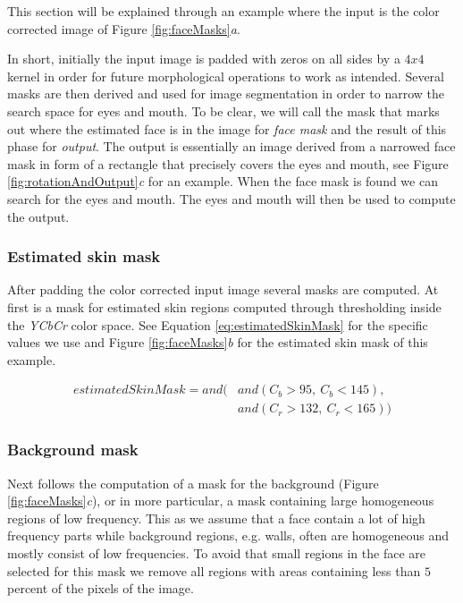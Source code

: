 This section will be explained through an example where the input is the color corrected image of Figure \ref{fig:faceMasks}\textit{a}.



In short, initially the input image is padded with zeros on all sides by a $4x4$ kernel in order for future morphological operations to work as intended. Several masks are then derived and used for image segmentation in order to narrow the search space for eyes and mouth. To be clear, we will call the mask that marks out where the estimated face is in the image for \textit{face mask} and the result of this phase for \textit{output}. The output is essentially an image derived from a narrowed face mask in form of a rectangle that precisely covers the eyes and mouth, see Figure \ref{fig:rotationAndOutput}\textit{c} for an example. When the face mask is found we can search for the eyes and mouth. The eyes and mouth will then be used to compute the output. 




\subsubsection{Estimated skin mask}
After padding the color corrected input image several masks are computed. At first is a mask for estimated skin regions computed through thresholding inside the \textit{YCbCr} color space. See Equation \ref{eq:estimatedSkinMask} for the specific values we use and Figure \ref{fig:faceMasks}\textit{b} for the estimated skin mask of this example.

\begin{equation} \label{eq:estimatedSkinMask}
\begin{split}
estimatedSkinMask = and( & and(C_{b}> 95, \ C_{b} < 145), \\
 & and(C_{r} > 132, \ C_{r} < 165))
\end{split}
\end{equation}

\subsubsection{Background mask}
Next follows the computation of a mask for the background (Figure \ref{fig:faceMasks}\textit{c}), or in more particular, a mask containing large homogeneous regions of low frequency. This as we assume that a face contain a lot of high frequency parts while background regions, e.g. walls, often are homogeneous and mostly consist of low frequencies. To avoid that small regions in the face are selected for this mask we remove all regions with areas containing less than $5$ percent of the pixels of the image.

